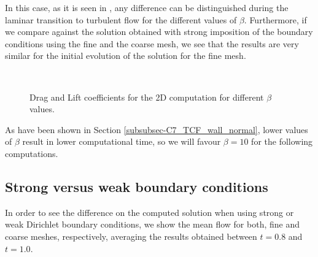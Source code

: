 In this case, as it is seen in , any difference can be distinguished during the laminar transition to turbulent flow for the different values of $ \beta $. Furthermore, if we compare against the solution obtained with strong imposition of the boundary conditions using the fine and the coarse mesh, we see that the results are very similar for the initial evolution of the solution for the fine mesh. 
\begin{figure}[h!]
  \centering
  \\
  \caption{Drag and Lift coefficients for the 2D computation for different $ \beta $ values.}
  \label{fig-NACA_b_drag_lift}
\end{figure}
As have been shown in Section \ref{subsubsec-C7_TCF_wall_normal}, lower values of $ \beta $ result in lower computational time, so we will favour $ \beta=10 $ for the following computations.

\subsection{Strong versus weak boundary conditions}
In order to see the difference on the computed solution when using strong or weak Dirichlet boundary conditions, we show the mean flow for both, fine and coarse meshes, respectively, averaging the results obtained between $ t=0.8 $ and $ t=1.0 $.

